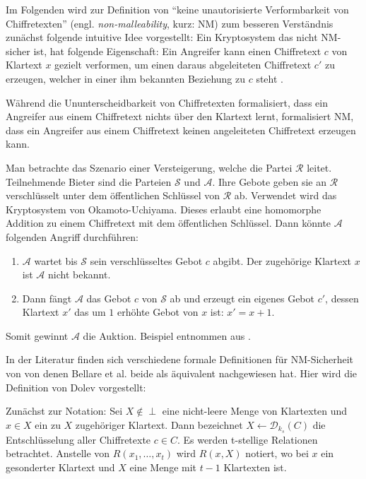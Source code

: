 Im Folgenden wird zur Definition von \enquote{keine unautorisierte Verformbarkeit von Chiffretexten} (engl. \textit{non-malleability}, kurz: NM) zum besseren Verständnis zunächst folgende intuitive Idee vorgestellt:
Ein Kryptosystem das nicht NM-sicher ist, hat folgende Eigenschaft: Ein Angreifer kann einen Chiffretext $c$ von Klartext $x$ gezielt verformen, um einen daraus abgeleiteten Chiffretext $c'$ zu erzeugen, welcher in einer ihm bekannten Beziehung zu $c$ steht \cite[p.292]{smart2003}.

Während die Ununterscheidbarkeit von Chiffretexten formalisiert, dass ein Angreifer aus einem Chiffretext nichts über den Klartext lernt, formalisiert NM, dass ein Angreifer aus einem Chiffretext keinen angeleiteten Chiffretext erzeugen kann.

Man betrachte das Szenario einer Versteigerung, welche die Partei $\mathcal{R}$ leitet. Teilnehmende Bieter sind die Parteien $\mathcal{S}$ und $\mathcal{A}$. Ihre Gebote geben sie an $\mathcal{R}$ verschlüsselt unter dem öffentlichen Schlüssel von $\mathcal{R}$ ab. Verwendet wird das Kryptosystem von Okamoto-Uchiyama. Dieses erlaubt eine homomorphe Addition zu einem Chiffretext mit dem öffentlichen Schlüssel. Dann könnte $\mathcal{A}$ folgenden Angriff durchführen:
\begin{enumerate}
	\item $\mathcal{A}$ wartet bis $\mathcal{S}$ sein verschlüsseltes Gebot $c$ abgibt. Der zugehörige Klartext $x$ ist $\mathcal{A}$ nicht bekannt.
	\item Dann fängt $\mathcal{A}$ das Gebot $c$ von $\mathcal{S}$ ab und erzeugt ein eigenes Gebot $c'$, dessen Klartext $x'$ das um $1$ erhöhte Gebot von $x$ ist: $x'=x+1$.
\end{enumerate} 
Somit gewinnt $\mathcal{A}$ die Auktion. Beispiel entnommen aus \cite[p.388]{katz2014introduction}.

In der Literatur finden sich verschiedene formale Definitionen für NM-Sicherheit von \cite[p.34]{bellare1998relations}\cite[p.12]{dolev2003nonmalleable} von denen Bellare et al. \cite{bellare1999non} beide als äquivalent nachgewiesen hat. Hier wird die Definition von Dolev \cite{bellare1998relations} vorgestellt:

Zunächst zur Notation: 
Sei $X\notin\perp$ eine nicht-leere Menge von Klartexten und $x\in X$ ein zu $X$ zugehöriger Klartext. Dann bezeichnet $X\leftarrow\mathcal{D}_{k_s}(C)$ die Entschlüsselung aller Chiffretexte $c\in C$. Es werden t-stellige Relationen betrachtet. Anstelle von $R(x_1,\ldots,x_t)$ wird $R(x,X)$ notiert, wo bei $x$ ein gesonderter Klartext und $X$ eine Menge mit $t-1$ Klartexten ist.

